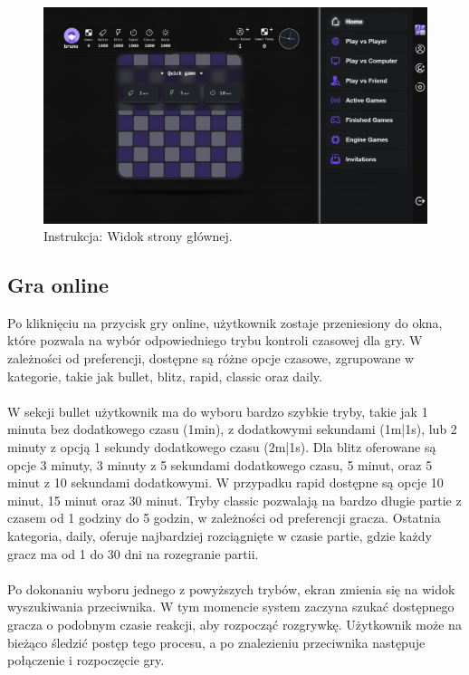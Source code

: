 \documentclass[12pt,a4paper]{article}
\begin{document}
\vspace{0.5cm}
\begin{figure}[h!]
    \centering
    \includegraphics[width=1\textwidth]{images/ins_main.png}
    \caption{Instrukcja: Widok strony głównej.}
\end{figure}

\newpage

\subsection{Gra online}

\noindent
Po kliknięciu na przycisk gry online, użytkownik zostaje przeniesiony do okna, które pozwala na wybór odpowiedniego trybu kontroli czasowej dla gry. W zależności od preferencji, dostępne są różne opcje czasowe, zgrupowane w kategorie, takie jak bullet, blitz, rapid, classic oraz daily.
\\\\
W sekcji bullet użytkownik ma do wyboru bardzo szybkie tryby, takie jak 1 minuta bez dodatkowego czasu (1min), z dodatkowymi sekundami (1m|1s), lub 2 minuty z opcją 1 sekundy dodatkowego czasu (2m|1s). Dla blitz oferowane są opcje 3 minuty, 3 minuty z 5 sekundami dodatkowego czasu, 5 minut, oraz 5 minut z 10 sekundami dodatkowymi. W przypadku rapid dostępne są opcje 10 minut, 15 minut oraz 30 minut. Tryby classic pozwalają na bardzo długie partie z czasem od 1 godziny do 5 godzin, w zależności od preferencji gracza. Ostatnia kategoria, daily, oferuje najbardziej rozciągnięte w czasie partie, gdzie każdy gracz ma od 1 do 30 dni na rozegranie partii.
\\\\
Po dokonaniu wyboru jednego z powyższych trybów, ekran zmienia się na widok wyszukiwania przeciwnika. W tym momencie system zaczyna szukać dostępnego gracza o podobnym czasie reakcji, aby rozpocząć rozgrywkę. Użytkownik może na bieżąco śledzić postęp tego procesu, a po znalezieniu przeciwnika następuje połączenie i rozpoczęcie gry.
\end{document}
